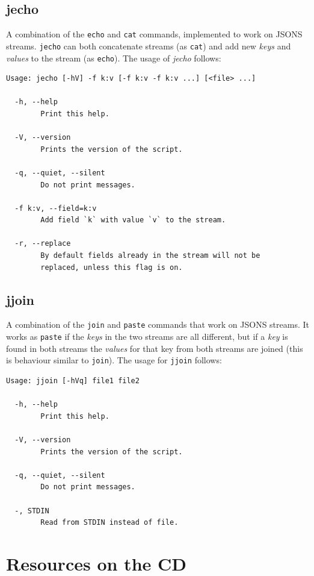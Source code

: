 \documentclass[11pt,a4paper,twoside,openright]{report}
\begin{document}
\section{jecho}

A combination of the \texttt{echo} and \texttt{cat} commands, implemented to
work on JSONS streams.  \texttt{jecho} can both concatenate streams (as
\texttt{cat}) and add new \emph{keys} and \emph{values} to the stream (as
\texttt{echo}).  The usage of \emph{jecho} follows:

{\small
\begin{Verbatim}[samepage=true]
Usage: jecho [-hV] -f k:v [-f k:v -f k:v ...] [<file> ...]

  -h, --help
        Print this help.

  -V, --version
        Prints the version of the script.

  -q, --quiet, --silent
        Do not print messages.

  -f k:v, --field=k:v
        Add field `k` with value `v` to the stream.

  -r, --replace
        By default fields already in the stream will not be
        replaced, unless this flag is on.
\end{Verbatim}
}

\section{jjoin}

A combination of the \texttt{join} and \texttt{paste} commands that work on
JSONS streams.  It works as \texttt{paste} if the \emph{keys} in the two
streams are all different, but if a \emph{key} is found in both streams the
\emph{values} for that key from both streams are joined (this is behaviour
similar to \texttt{join}).  The usage for \texttt{jjoin} follows:

{\small
\begin{Verbatim}[samepage=true]
Usage: jjoin [-hVq] file1 file2

  -h, --help
        Print this help.

  -V, --version
        Prints the version of the script.

  -q, --quiet, --silent
        Do not print messages.

  -, STDIN
        Read from STDIN instead of file.
\end{Verbatim}
}

\clearpage{\pagestyle{empty}\cleardoublepage}
\chapter{Resources on the CD}
\label{chap:resources}
\end{document}
